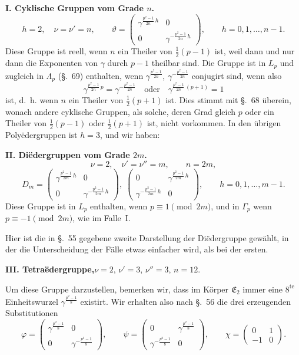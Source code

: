 \documentclass[12pt,a4paper]{article}
\begin{document}
\medskip\noindent
\textbf{I. Cyklische Gruppen vom Grade $n$.}
\[
h = 2,\quad \nu = \nu' = n,\qquad
\vartheta = \begin{pmatrix}
\gamma^{\frac{p^{2}-1}{2n}\,h}&0\\[4pt]
0&\gamma^{-\frac{p^{2}-1}{2n}\,h}
\end{pmatrix},\qquad
h = 0, 1, \ldots, n-1.
\]
Diese Gruppe ist reell, wenn $n$ ein Theiler von $\frac{1}{2}(p-1)$ ist, weil dann und nur dann die Exponenten von $\gamma$ durch $p-1$ theilbar sind. Die Gruppe ist in $L_{p}$ und zugleich in $\varLambda_{p}$ (\S.~69) enthalten, wenn $\gamma^{\frac{p^{2}-1}{2n}}$, $\gamma^{-\frac{p^{2}-1}{2n}}$ conjugirt sind, wenn also
\[
\gamma^{\frac{p^{2}-1}{2n}\,p} = \gamma^{-\frac{p^{2}-1}{2n}}\quad\text{oder}\quad
\gamma^{\frac{p^{2}-1}{2n}\,(p+1)} = 1
\]
ist, d.~h. wenn $n$ ein Theiler von $\frac{1}{2}(p+1)$ ist. Dies stimmt mit \S.~68 überein, wonach andere cyklische Gruppen, als solche, deren Grad gleich $p$ oder ein Theiler von $\frac{1}{2}(p-1)$ oder $\frac{1}{2}(p+1)$ ist, nicht vorkommen. In den übrigen Polyëdergruppen ist $h = 3$, und wir haben:

\medskip\noindent
\textbf{II. Diëdergruppen vom Grade $2m$.}
\[
\nu = 2,\quad \nu' = \nu'' = m,\qquad
n = 2m,
\]
\[
D_{m} = \begin{pmatrix}
\gamma^{\frac{p^{2}-1}{2m}\,h}&0\\[4pt]
0&\gamma^{-\frac{p^{2}-1}{2m}\,h}
\end{pmatrix},\;
\begin{pmatrix}
0&\gamma^{\frac{p^{2}-1}{2m}\,h}\\[4pt]
\gamma^{-\frac{p^{2}-1}{2m}\,h}&0
\end{pmatrix},\qquad
h = 0, 1, \ldots, m-1.
\]
Diese Gruppe ist in $L_{p}$ enthalten, wenn $p \equiv 1 \pmod{2m}$, und in $\varGamma_{p}$ wenn $p \equiv -1 \pmod{2m}$, wie im Falle~I.

Hier ist die in \S.~55 gegebene zweite Darstellung der Diëdergruppe gewählt, in der die Unterscheidung der Fälle etwas einfacher wird, als bei der ersten.

\medskip\noindent
\textbf{III. Tetraëdergruppe,}\quad $\nu = 2$, $\nu' = 3$, $\nu'' = 3$, $n = 12$.

Um diese Gruppe darzustellen, bemerken wir, dass im Körper $\mathfrak{E}_{2}$ immer eine $8^{\text{te}}$ Einheitswurzel $\gamma^{\frac{p^{2}-1}{8}}$ existirt. Wir erhalten also nach \S.~56 die drei erzeugenden Substitutionen
\[
\varphi = \begin{pmatrix}\gamma^{\frac{p^{2}-1}{8}}&0\\[4pt]0&\gamma^{-\frac{p^{2}-1}{8}}\end{pmatrix},\qquad
\psi = \begin{pmatrix}0&\gamma^{\frac{p^{2}-1}{8}}\\[4pt]\gamma^{-\frac{p^{2}-1}{8}}&0\end{pmatrix},\qquad
\chi = \begin{pmatrix}0&1\\-1&0\end{pmatrix}.
\]
\end{document}
